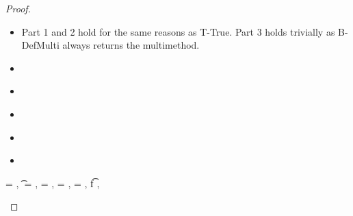 \begin{lemma}
\begin{enumerate}
\begin{proof}
\begin{case}[T-DefMulti]
\begin{itemize}
  \item[]
\begin{subcase}[B-DefMulti]
Part 1 and 2 hold for the same reasons as T-True.
Part 3 holds trivially as B-DefMulti always returns the multimethod.
\end{subcase}
  \item[]
\begin{subcase}[BE-DefMulti]
\end{subcase}
\end{itemize}
\end{case}

\begin{case}[T-DefMethod]

  \begin{itemize}
    \item[]
      \begin{subcase}[B-DefMethod]
      \end{subcase}
    \item[]
      \begin{subcase}[BE-DefMethod1]
      \end{subcase}
    \item[]
      \begin{subcase}[BE-DefMethod2]
      \end{subcase}
    \item[]
      \begin{subcase}[BE-DefMethod3]
      \end{subcase}
  \end{itemize}
\end{case}

\begin{case}[T-App]
  \e{} = { {}},
  \t{} = {
                      {}
                      {\x{}}},
  {\thenprop {\prop{}}} = 
                 {
                              {}
                              {\x{}}},
  {\elseprop {\prop{}}} = 
                 {
                              {}
                              {\x{}}},
  \object{} = {
                              {}
                              {\x{}}},
  \judgement {\propenv{}} { {\ArrowOne {\x{}} {\s{}}
                                                       {\t{f}}
                                                       {
                                                                   {}}
                                                       {}}}
                {
                            {}}
                {},
  \judgement {\propenv{}}
                 { {\s{}}}
                 {
                             {}}
                 {} 


\end{case}
\end{proof}
\end{enumerate}
\end{lemma}

